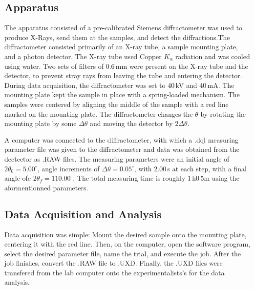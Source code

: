 \documentclass[12pt]{article}
\begin{document}
\subsection{Apparatus}
The apparatus consisted of a pre-calibrated Siemens diffractometer was used to produce X-Rays, 
send them at the samples, and 
detect the diffractions.The diffractometer consisted primarily of an X-ray tube, a sample mounting plate, and a 
photon detector. The X-ray tube used Copper $K_{\alpha}$ radiation and was cooled using water. Two sets of filters of 
0.6\,mm were present on the X-ray tube and the detector, to prevent stray rays from leaving
the tube and entering the detector. During data acquisition, the diffractometer was set to 
40\,kV and 40\,mA. The mounting plate kept the sample in place with a spring-loaded mechanism. 
The samples were centered by aligning the middle of the sample with a red line marked on the 
mounting plate. The diffractometer changes the $\theta$ by rotating the mounting plate by some $\Delta\theta$
and moving the detector by $2\Delta\theta$.

A computer was connected to the diffractometer, with which a .dql measuring parameter file was given to the diffractometer and data was obtained from the 
dectector as .RAW files. The measuring parameters were an initial angle of $2\theta_0=5.00^{\circ}$, 
angle increments of $\Delta\theta=0.05^{\circ}$, with 2.00\,s at each step, with a final 
angle ofe $2\theta_f=110.00^{\circ}$. The total measuring time is roughly 1\,h0\,5m using the aformentionned
parameters.

\subsection{Data Acquisition and Analysis}
Data acquisition was simple: Mount the desired sample onto the mounting plate, centering it
with the red line. Then, on the computer, open the software program, select the desired 
parameter file, name the trial, and execute the job. After the job finishes, convert the .RAW file to .UXD.
Finally, the .UXD files were transfered from the lab computer onto the experimentalists's for 
the data analysis.
\end{document}
